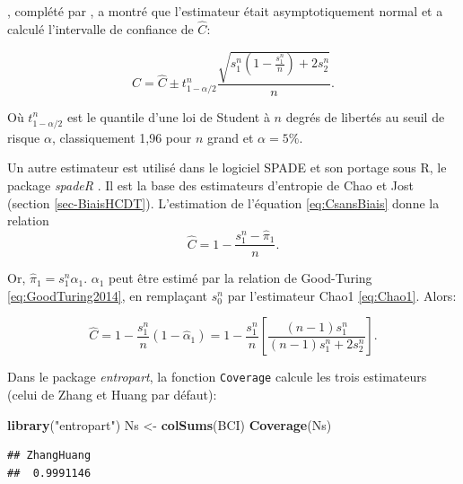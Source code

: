 \documentclass[
  11pt,
  french,
  a4paper,
  extrafontsizes,onecolumn,openright
  ]{memoir}
\newenvironment{Shaded}{\begin{snugshade}}{\end{snugshade}}
\newcommand{\KeywordTok}[1]{\textcolor[rgb]{0.13,0.29,0.53}{\textbf{#1}}}
\newcommand{\NormalTok}[1]{#1}
\newcommand{\StringTok}[1]{\textcolor[rgb]{0.31,0.60,0.02}{#1}}
\begin{document}
\textcite{Esty1983}, complété par \textcite{Zhang2009}, a montré que l'estimateur était asymptotiquement normal et a calculé l'intervalle de confiance de \(\hat{C}\):

\begin{equation}
  \label{eq:hatC}
  C=\hat{C}\pm t^{n}_{1-\alpha/2} \frac{\sqrt{s^{n}_{1}\left(1-\frac{s^{n}_{1}}{n}\right)+2s^{n}_{2}}}{n}.
\end{equation}

Où \(t^{n}_{1-\alpha/2}\) est le quantile d'une loi de Student à \(n\) degrés de libertés au seuil de risque \(\alpha\), classiquement 1,96 pour \(n\) grand et \(\alpha=5\%\).

Un autre estimateur est utilisé dans le logiciel SPADE \autocite{Chao2010a} et son portage sous R, le package \emph{spadeR} \autocite{Chao2016c}.
Il est la base des estimateurs d'entropie de Chao et Jost (section \ref{sec-BiaisHCDT}).
L'estimation de l'équation \eqref{eq:CsansBiais} donne la relation
\begin{equation}
  \label{eq:hatC2}
  \hat{C} = 1-\frac{s^{n}_{1} - \hat{\pi}_1}{n}.
\end{equation}

Or, \(\hat{\pi}_1 = s^{n}_{1} \hat{\alpha}_1\).
\(\alpha_1\) peut être estimé par la relation de Good-Turing \eqref{eq:GoodTuring2014}, en remplaçant \(s^{n}_{0}\) par l'estimateur Chao1 \eqref{eq:Chao1}.
Alors:

\begin{equation} 
  \label{eq:CChao}
  \hat{C} = 1-\frac{s^{n}_{1}}{n}(1 - \hat{\alpha}_1)
  = 1-\frac{s^{n}_{1}}{n}\left[\frac{\left(n-1\right)s^{n}_{1}}{\left(n-1\right)s^{n}_{1}+2s^{n}_{2}}\right].
\end{equation}

Dans le package \emph{entropart}, la fonction \texttt{Coverage} calcule les trois estimateurs (celui de Zhang et Huang par défaut):

\scriptsize

\begin{Shaded}
\begin{Highlighting}[]
\KeywordTok{library}\NormalTok{(}\StringTok{"entropart"}\NormalTok{)}
\NormalTok{Ns <-}\StringTok{ }\KeywordTok{colSums}\NormalTok{(BCI)}
\KeywordTok{Coverage}\NormalTok{(Ns)}
\end{Highlighting}
\end{Shaded}

\begin{verbatim}
## ZhangHuang 
##  0.9991146
\end{verbatim}
\end{document}
